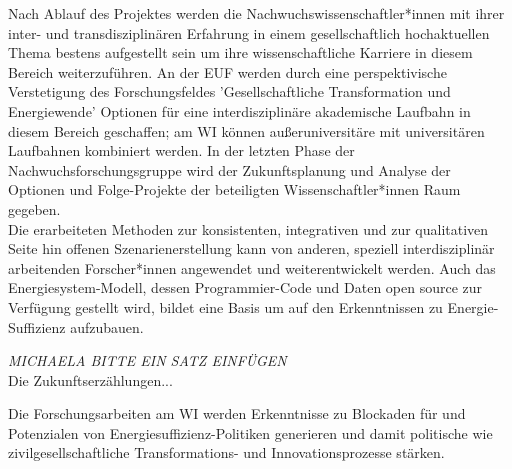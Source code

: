 \documentclass[a4paper,11pt,twoside]{scrartcl}
\begin{document}
Nach Ablauf des Projektes werden die Nachwuchswissenschaftler*innen mit ihrer inter- und transdisziplinären Erfahrung in einem gesellschaftlich hochaktuellen Thema bestens aufgestellt sein um ihre wissenschaftliche Karriere in diesem Bereich weiterzuführen. An der EUF werden durch eine perspektivische Verstetigung des Forschungsfeldes 'Gesellschaftliche Transformation und Energiewende' Optionen für eine interdisziplinäre akademische Laufbahn in diesem Bereich geschaffen; am WI können außeruniversitäre mit universitären Laufbahnen kombiniert werden. In der letzten Phase der Nachwuchsforschungsgruppe wird der Zukunftsplanung und Analyse der Optionen und Folge-Projekte der beteiligten Wissenschaftler*innen Raum gegeben.\\
Die erarbeiteten Methoden zur konsistenten, integrativen und zur qualitativen Seite hin offenen Szenarienerstellung kann von anderen, speziell interdisziplinär arbeitenden Forscher*innen angewendet und weiterentwickelt werden. Auch das Energiesystem-Modell, dessen Programmier-Code und Daten open source zur Verfügung gestellt wird, bildet eine Basis um auf den Erkenntnissen zu Energie-Suffizienz aufzubauen. 

\textit{MICHAELA BITTE EIN SATZ EINFÜGEN}\\
Die Zukunftserzählungen... 

Die Forschungsarbeiten am WI werden Erkenntnisse zu Blockaden für und Potenzialen von Energiesuffizienz-Politiken generieren und damit politische wie zivilgesellschaftliche Transformations- und Innovationsprozesse stärken.

\end{document}
